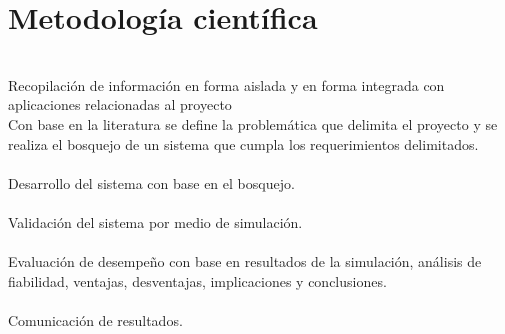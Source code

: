 \section {Metodología científica}
\ \\
Recopilación de información en forma aislada y en forma integrada con aplicaciones relacionadas al proyecto\\
Con base en la literatura se define la problemática que delimita el proyecto y se realiza el bosquejo de un sistema que cumpla los requerimientos delimitados.\\\\
Desarrollo del sistema con base en el bosquejo.\\\\
Validación del sistema por medio de simulación.\\\\
Evaluación de desempeño con base en resultados de la simulación, análisis de fiabilidad, ventajas, desventajas, implicaciones y conclusiones.\\\\
Comunicación de resultados.